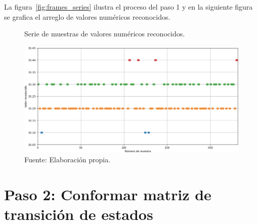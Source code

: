 La figura~\ref{fig:frames_series} ilustra el proceso del paso 1 y en la siguiente figura se grafica el arreglo de
valores numéricos reconocidos.
%
\begin{figure}[!h]
    \caption{Serie de muestras de valores numéricos reconocidos.}
    \label{fig:recognized_samples}
    \includegraphics[width=\textwidth]{5_MC_incertidumbre/recognizedSamples}
    \caption*{\footnotesize Fuente: Elaboración propia.}
\end{figure}
\vfill

\section*{Paso 2: Conformar matriz de transición de estados}
\label{sec:transition_matrix}


